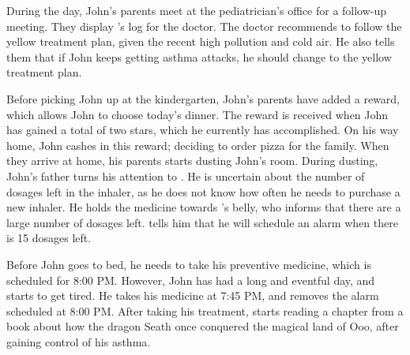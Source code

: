 During the day, John's parents meet at the pediatrician's office for a follow-up meeting. They display \app{}'s log for the doctor. The doctor recommends to follow the yellow treatment plan, given the recent high pollution and cold air. He also tells them that if John keeps getting asthma attacks, he should change to the yellow treatment plan.

Before picking John up at the kindergarten, John's parents have added a reward, which allows John to choose today's dinner. The reward is received when John has gained a total of two stars, which he currently has accomplished. On his way home, John cashes in this reward; deciding to order pizza for the family. When they arrive at home, his parents starts dusting John's room. During dusting, John's father turns his attention to \buddy{}. He is uncertain about the number of dosages left in the inhaler, as he does not know how often he needs to purchase a new inhaler. He holds the medicine towards \buddy{}'s belly, who informs that there are a large number of dosages left. \buddy{} tells him that he will schedule an alarm when there is 15 dosages left. 

Before John goes to bed, he needs to take his preventive medicine, which is scheduled for 8:00 PM. However, John has had a long and eventful day, and starts to get tired. He takes his medicine at 7:45 PM, and \buddy{} removes the alarm scheduled at 8:00 PM. After taking his treatment, \buddy{} starts reading a chapter from a book about how the dragon Seath once conquered the magical land of Ooo, after gaining control of his asthma. 